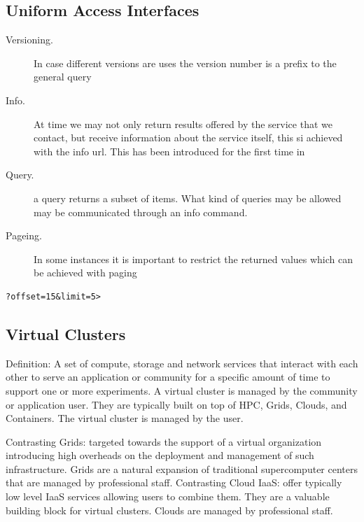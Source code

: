 \subsection{Uniform Access Interfaces}

\begin{description}

\item[Versioning.] In case different versions are uses the version number is a prefix to
the general query

\item [Info.] At time we may not only return results offered by the service that we
contact, but receive information about the service itself, this si
achieved with the info url. This has been introduced for the first
time in \cite{???infogram}

\item [Query.] a query returns a subset of items. What kind of queries
  may be allowed may be communicated through an info command.

\item [Pageing.] In some instances it is important to restrict the returned values
which can be achieved with paging

\end{description}

\begin{Verbatim}
?offset=15&limit=5>
\end{Verbatim}

\subsection{Virtual Clusters}

Definition: A set of compute, storage and network services that
interact with each other to serve an application or community for a
specific amount of time to support one or more experiments. A virtual
cluster is managed by the community or application user. They are
typically built on top of HPC, Grids, Clouds, and Containers. The
virtual cluster is managed by the user.

Contrasting Grids: targeted towards the support of a virtual
organization introducing high overheads on the deployment and
management of such infrastructure. Grids are a natural expansion of
traditional supercomputer centers that are managed by professional
staff. Contrasting Cloud IaaS: offer typically low level IaaS services
allowing users to combine them. They are a valuable building block for
virtual clusters. Clouds are managed by professional staff.

